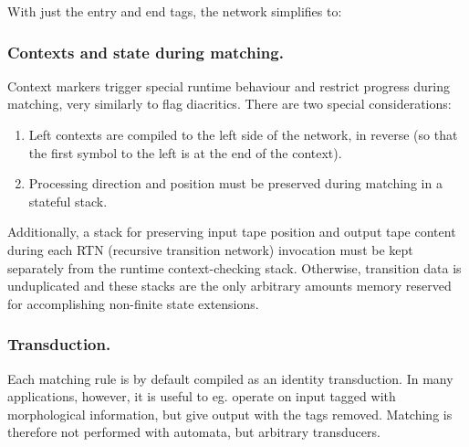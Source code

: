 \documentclass{llncs}
\begin{document}
With just the entry and end tags, the network simplifies to:


\subsubsection{Contexts and state during matching.}

Context markers trigger special runtime behaviour and restrict
progress during matching, very similarly to flag diacritics.
There are two special considerations:

\begin{enumerate}
\item Left contexts are compiled to the left side of the network, in reverse
(so that the first symbol to the left is at the end of the context).
\item Processing direction and position must be preserved during
matching in a stateful stack.
\end{enumerate}

Additionally, a stack for preserving input tape position
and output tape content during each RTN (recursive transition
network) invocation must be kept separately from the runtime
context-checking stack. Otherwise, transition data is unduplicated
and these stacks are the only arbitrary amounts memory reserved
for accomplishing non-finite state extensions.

\subsubsection{Transduction.}

Each matching rule is by default compiled as an identity transduction.
In many applications, however, it is useful to eg. operate on input
tagged with morphological information, but give output
with the tags removed. Matching is therefore not
performed with automata, but arbitrary transducers.
\end{document}
